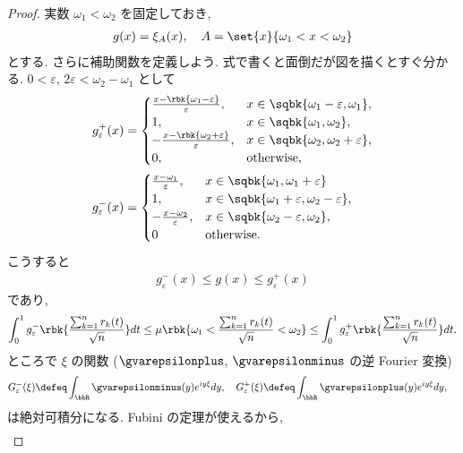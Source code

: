 \documentclass[openany, a4paper, oneside]{jsbook}
\begin{document}
\begin{proof}
実数 $\omega_1 < \omega_2$ を固定しておき,
\begin{align}
 g (x)
 =
 \xi_{A} (x), \quad A = \set{x}{\omega_1 < x < \omega_2}
\end{align}
とする.
さらに補助関数を定義しよう.
式で書くと面倒だが図を描くとすぐ分かる.
$0 < \varepsilon$, $2 \varepsilon < \omega_2 - \omega_1$ として
\begin{align}
 g_{\varepsilon}^{+}(x)
 &=
 \begin{cases}
  \frac{x - \rbk{\omega_1 - \varepsilon}}{\varepsilon}, & x \in \sqbk{\omega_1 - \varepsilon, \omega_1}, \\
  1, & x \in \sqbk{\omega_1, \omega_2}, \\
  -\frac{x - \rbk{\omega_2 + \varepsilon}}{\varepsilon}, & x \in \sqbk{\omega_2, \omega_2 + \varepsilon}, \\
  0, & \text{otherwise},
 \end{cases} \\
 g_{\varepsilon}^{-}(x)
 &=
 \begin{cases}
  \frac{x - \omega_1}{\varepsilon}, & x \in \sqbk{\omega_1, \omega_1 + \varepsilon} \\
  1, & x \in \sqbk{\omega_1 + \varepsilon, \omega_2 - \varepsilon}, \\
  -\frac{x - \omega_2}{\varepsilon}, & x \in \sqbk{\omega_2 - \varepsilon, \omega_2}, \\
  0 & \text{otherwise}.
 \end{cases}
\end{align}
こうすると
\begin{align}
 g_{\varepsilon}^{-} (x) \leq g (x) \leq g_{\varepsilon}^{+}(x)
\end{align}
であり,
\begin{align}
 \int_0^1 g_{\varepsilon}^{-} \rbk{\frac{\sum_{k=1}^{n} r_k (t)}{\sqrt{n}}} dt
 \leq
 \mu \rbk{\omega_1 < \frac{\sum_{k=1}^{n} r_k (t)}{\sqrt{n}} < \omega_2}
 \leq
 \int_0^1 g_{\varepsilon}^{+} \rbk{\frac{\sum_{k=1}^{n} r_k (t)}{\sqrt{n}}} dt.
\end{align}
ところで $\xi$ の関数 ($\gvarepsilonplus$, $\gvarepsilonminus$ の逆 Fourier 変換)
\begin{align}
 G_{\varepsilon}^{-} (\xi)
 \defeq
 \int_{\bbR} \gvarepsilonminus (y) e^{iy \xi} dy, \quad
 G_{\varepsilon}^{+} (\xi)
 \defeq
 \int_{\bbR} \gvarepsilonplus (y) e^{iy \xi} dy, \quad
\end{align}
は絶対可積分になる.
Fubini の定理が使えるから,
\begin{align}

\end{align}
\end{proof}
\end{document}
